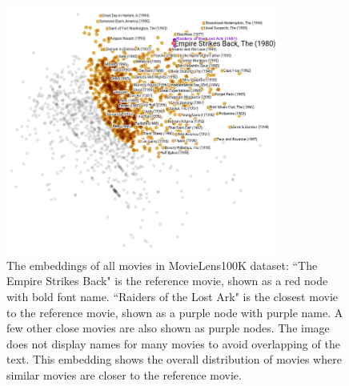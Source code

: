 \documentclass[book,12pt]{WSUThesis}
\theoremstyle{definition}
\begin{document}
\begin{figure}[!ht]\centering
	\includegraphics[width=0.8\textwidth]{movies-annotation}
	\caption{
		The embeddings of all movies in MovieLens100K dataset:
		``The Empire Strikes Back" is the reference movie, shown as a red node with bold font name.
		``Raiders of the Lost Ark" is the closest movie to the reference movie, shown as a purple node with purple name.
		A few other close movies are also shown as purple nodes.
		The image does not display names for many movies to avoid overlapping of the text.
		This embedding shows the overall distribution of movies where similar movies are closer to the reference movie.
	}
	\label{fig:movies}
\end{figure}
\end{document}
